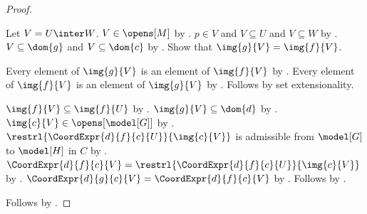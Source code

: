 \begin{proof}
\begin{subproof}
        Let $V=U\inter W$.
        $V\in\opens[M]$ by .
        $p\in V$ and $V\subseteq U$ and $V\subseteq W$ by
            .
        $V\subseteq\dom{g}$ and $V\subseteq\dom{c}$ by .
        Show that $\img{g}{V}=\img{f}{V}$.
        \begin{subproof}
            Every element of $\img{g}{V}$ is an element of $\img{f}{V}$ by
                .
            Every element of $\img{f}{V}$ is an element of $\img{g}{V}$ by
                .
            Follows by set extensionality.
        \end{subproof}
        $\img{f}{V}\subseteq\img{f}{U}$ by .
        $\img{g}{V}\subseteq\dom{d}$ by .
        $\img{c}{V}\in\opens[\model[G]]$ by .
        $\restrl{\CoordExpr{d}{f}{c}{U}}{\img{c}{V}}$ is admissible
            from $\model[G]$ to $\model[H]$ in $C$ by .
        $\CoordExpr{d}{f}{c}{V}=\restrl{\CoordExpr{d}{f}{c}{U}}{\img{c}{V}}$ by
            .
        $\CoordExpr{d}{g}{c}{V}=\CoordExpr{d}{f}{c}{V}$ by
            .
        Follows by .
    \end{subproof}
    Follows by .
\end{proof}

